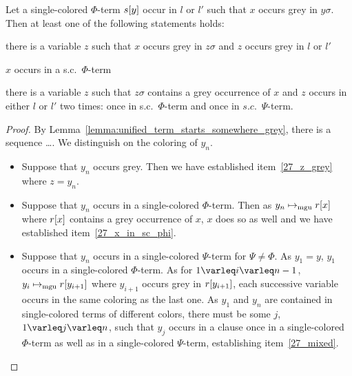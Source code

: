 \documentclass[,%
	paper=a4,%
	DIV11, %
	twoside=false,%
	liststotoc,
	bibtotoc,
	draft=false,%
	numbers=noendperiod
]{scrartcl}
\begin{document}
\begin{lemma}
	\label{lemma:colored_y_sigma_contains_grey_x}
	Let a single-colored $\Phi$-term $s[y]$ occur in $l$ or $l'$ such that $x$ occurs grey in $y\sigma$.
	Then at least one of the following statements holds:
	\begin{compactenum}
	\item
		there is a variable $z$ such that $x$ occurs grey in $z\sigma$ and $z$ occurs grey in $l$ or $l'$
		\label{27_z_grey}
	\item $x$ occurs in a s.c.\ $\Phi$-term \label{27_x_in_sc_phi}
	\item there is a variable $z$ such that $z\sigma$ contains a grey occurrence of $x$ and $z$ occurs in either $l$ or $l'$ two times: once in s.c.\ $\Phi$-term and once in $s.c.$\ $\Psi$-term.
		\label{27_mixed}

	\end{compactenum}
\end{lemma}
\begin{proof}

	By Lemma~\ref{lemma:unified_term_starts_somewhere_grey}, there is a sequence \dots.
	We distinguish on the coloring of $y_n$.

	\begin{itemize}
		\item Suppose that $y_n$ occurs grey. 
			Then we have established item~\ref{27_z_grey} where $z=y_n$.
		\item 
			Suppose that $y_n$ occurs in a single-colored $\Phi$-term.
			Then as $y_n \mapsto_{\operatorname{mgu}} r[x]$ where $r[x]$ contains a grey occurrence of $x$, $x$ does so as well and we have established item~\ref{27_x_in_sc_phi}.
		\item 
			Suppose that $y_n$ occurs in a single-colored $\Psi$-term for $\Psi \neq \Phi$.
			As $y_1 = y$, $y_1$ occurs in a single-colored $\Phi$-term.
			As for $1 \varleq i \varleq n-1$, $y_i \mapsto_{\operatorname{mgu}} r[y_{i+1}]$ where $y_{i+1}$ occurs grey in  $r[y_{i+1}]$, each successive variable occurs in the same coloring as the last one.
			As $y_1$ and $y_n$ are contained in single-colored terms of different colors, there must be some $j$, $1\varleq j\varleq n$, such that $y_j$ occurs in a clause once in a single-colored $\Phi$-term as well as in a single-colored $\Psi$-term, establishing item~\ref{27_mixed}.
			\qedhere
	\end{itemize}

\end{proof}
\end{document}

